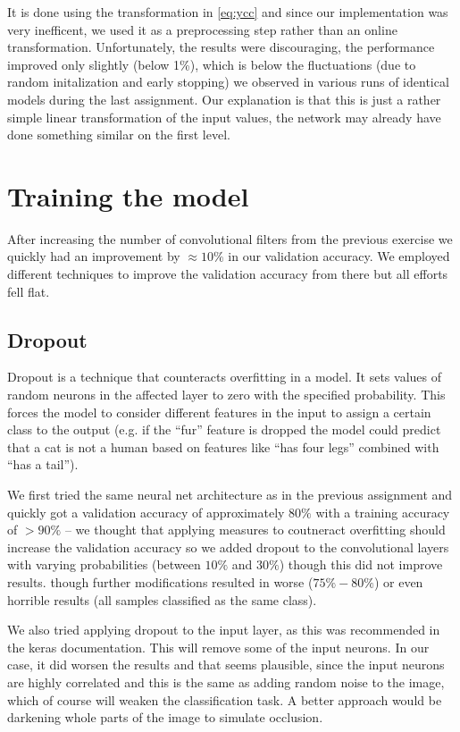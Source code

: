 It is done using the transformation in \eqref{eq:ycc} and since our implementation was very inefficent, we used it as a preprocessing step rather than an online transformation. 
Unfortunately, the results were discouraging, the performance improved only slightly (below 1\%), which is below the fluctuations (due to random initalization and early stopping) we observed in various runs of identical models during the last assignment. Our explanation is that this is just a rather simple linear transformation of the input values, the network may already have done something similar on the first level. 




\section{Training the model}
After increasing the number of convolutional filters from the previous exercise we quickly had an improvement by $\approx 10\%$ in our validation accuracy. We employed different techniques to improve the validation accuracy from there but all efforts fell flat. 

\subsection{Dropout}
Dropout is a technique that counteracts overfitting in a model. It sets values of random neurons in the affected layer to zero with the specified probability. This forces the model to consider different features in the input to assign a certain class to the output (e.g. if the ``fur'' feature is dropped the model could predict that a cat is not a human based on features like ``has four legs'' combined with ``has a tail''). 


We first tried the same neural net architecture as in the previous assignment and quickly got a validation accuracy of approximately $80\%$ with a training accuracy of $>90\%$ -- we thought that applying measures to coutneract overfitting should increase the validation accuracy so we added dropout to the convolutional layers with varying probabilities (between $10\%$ and $30\%$) though this did not improve results.
though further modifications resulted in worse ($75\% - 80\%$) or even horrible results (all samples classified as the same class). 

We also tried applying dropout to the input layer, as this was recommended in the keras documentation. This will remove some of the input neurons. In our case, it did worsen the results and that seems plausible, since the input neurons are highly correlated and this is the same as adding random noise to the image, which of course will weaken the classification task. A better approach would be darkening whole parts of the image to simulate occlusion.


